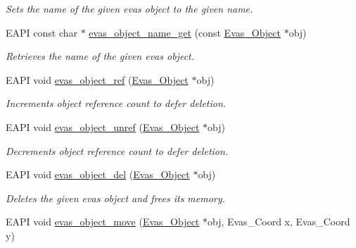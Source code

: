\begin{DoxyCompactItemize}
\begin{DoxyCompactList}\small\item\em Sets the name of the given evas object to the given name. \item\end{DoxyCompactList}\item 
EAPI const char $\ast$ \hyperlink{group__Evas__Object__Group__Basic_gac34b593d79bfd9284787ddbb43486edd}{evas\_\-object\_\-name\_\-get} (const \hyperlink{group__Evas__Object__Group_ga9e19e6dd1f517a0ba437c0114d3e7c97}{Evas\_\-Object} $\ast$obj)
\begin{DoxyCompactList}\small\item\em Retrieves the name of the given evas object. \item\end{DoxyCompactList}\item 
EAPI void \hyperlink{group__Evas__Object__Group__Basic_gaa22895e88e2cb157b9c38a6d3ce10723}{evas\_\-object\_\-ref} (\hyperlink{group__Evas__Object__Group_ga9e19e6dd1f517a0ba437c0114d3e7c97}{Evas\_\-Object} $\ast$obj)
\begin{DoxyCompactList}\small\item\em Increments object reference count to defer deletion. \item\end{DoxyCompactList}\item 
EAPI void \hyperlink{group__Evas__Object__Group__Basic_ga956f8793fd2897945d90bda2d4d08089}{evas\_\-object\_\-unref} (\hyperlink{group__Evas__Object__Group_ga9e19e6dd1f517a0ba437c0114d3e7c97}{Evas\_\-Object} $\ast$obj)
\begin{DoxyCompactList}\small\item\em Decrements object reference count to defer deletion. \item\end{DoxyCompactList}\item 
EAPI void \hyperlink{group__Evas__Object__Group__Basic_ga6d840e8d5670db3ae32e00c4ecbb6abd}{evas\_\-object\_\-del} (\hyperlink{group__Evas__Object__Group_ga9e19e6dd1f517a0ba437c0114d3e7c97}{Evas\_\-Object} $\ast$obj)
\begin{DoxyCompactList}\small\item\em Deletes the given evas object and frees its memory. \item\end{DoxyCompactList}\item 
EAPI void \hyperlink{group__Evas__Object__Group__Basic_ga78fa8858c51707f1a557b720014b71cc}{evas\_\-object\_\-move} (\hyperlink{group__Evas__Object__Group_ga9e19e6dd1f517a0ba437c0114d3e7c97}{Evas\_\-Object} $\ast$obj, Evas\_\-Coord x, Evas\_\-Coord y)

\end{DoxyCompactItemize}
